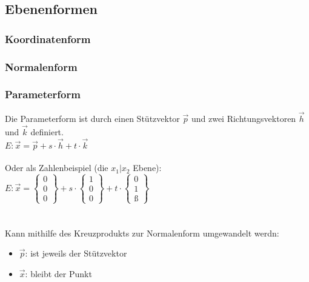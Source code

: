 \subsection{Ebenenformen}
\label{sec:ebenen_formen}
\subsubsection{Koordinatenform}
\subsubsection{Normalenform}
\subsubsection{Parameterform}
Die Parameterform ist durch einen Stützvektor $\vec{p}$ und zwei Richtungsvektoren $\vec{h}$ und $\vec{k}$ definiert. \\
$
E: \vec{x} = \vec{p} + s\cdot\vec{h} + t\cdot\vec{k}
$
\\\\
Oder als Zahlenbeispiel (die $x_1 | x_2$ Ebene): \\
$
E: \vec{x} = 
\begin{Bmatrix}
    0 \\ 0 \\ 0
\end{Bmatrix}
 + s \cdot
\begin{Bmatrix}
    1 \\ 0 \\ 0
\end{Bmatrix}
 + t \cdot 
 \begin{Bmatrix}
    0 \\ 1 \\ ß
 \end{Bmatrix}
$
\\\\\\
Kann mithilfe des Kreuzprodukts zur Normalenform umgewandelt werdn: \\
\begin{itemize}
    \item $\vec{p}$: ist jeweils der Stützvektor
    \item $\vec{x}$: bleibt der Punkt
\end{itemize}

